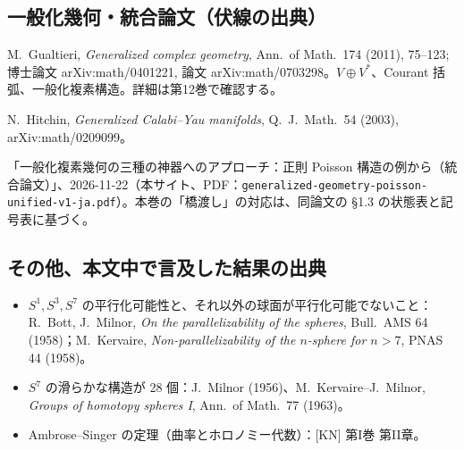 \subsection*{一般化幾何・統合論文（伏線の出典）}
\begin{description}[leftmargin=2.2em,labelindent=0pt,itemsep=3pt]
\item[{[Gu]}] M.~Gualtieri, \emph{Generalized complex geometry}, Ann.\ of Math.\ 174 (2011), 75--123; 博士論文 arXiv:math/0401221, 論文 arXiv:math/0703298。$V\oplus V^*$、Courant 括弧、一般化複素構造。詳細は第12巻で確認する\tQ。
\item[{[Hit]}] N.~Hitchin, \emph{Generalized Calabi--Yau manifolds}, Q.~J.~Math.\ 54 (2003), arXiv:math/0209099。
\item[{[統合論文]}]\raggedright 「一般化複素幾何の三種の神器へのアプローチ：正則 Poisson 構造の例から（統合論文）」、2026-11-22（本サイト、PDF：\texttt{generalized-geometry-poisson-unified-v1-ja.pdf}）。本巻の「橋渡し」の対応は、同論文の §1.3 の状態表と記号表に基づく。
\end{description}

\subsection*{その他、本文中で言及した結果の出典}
\begin{itemize}[itemsep=2pt]
\item $S^1,S^3,S^7$ の平行化可能性と、それ以外の球面が平行化可能でないこと：R.~Bott, J.~Milnor, \emph{On the parallelizability of the spheres}, Bull.\ AMS 64 (1958)；M.~Kervaire, \emph{Non-parallelizability of the $n$-sphere for $n>7$}, PNAS 44 (1958)。\tC
\item $S^7$ の滑らかな構造が 28 個：J.~Milnor (1956)、M.~Kervaire--J.~Milnor, \emph{Groups of homotopy spheres I}, Ann.\ of Math.\ 77 (1963)。\tC
\item Ambrose--Singer の定理（曲率とホロノミー代数）：[KN] 第I巻 第II章。\tC
\end{itemize}

\clearpage
